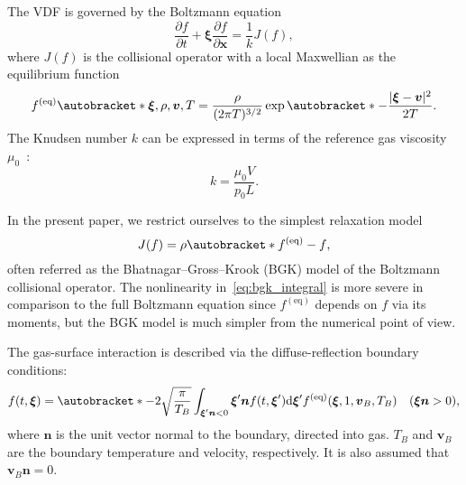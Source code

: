 \documentclass{elsarticle} %
\newcommand{\dd}{\mathrm{d}}
\newcommand{\pder}[2][]{\frac{\partial#1}{\partial#2}}
\DeclarePairedDelimiter\autobracket()       %
\newcommand{\br}[1]{\autobracket*{#1}}
\newcommand{\dxi}{\dd{\boldsymbol{\xi}}}
\newcommand{\bxi}{\boldsymbol{\xi}}
\newcommand{\bv}{\boldsymbol{v}}
\newcommand{\bn}{\boldsymbol{n}}
\newcommand{\bx}{\boldsymbol{x}}
\newcommand{\equil}[1]{#1^\mathrm{(eq)}}
\newcommand{\refer}[1]{#1_0}
\begin{document}
The VDF is governed by the Boltzmann equation
\begin{equation}\label{eq:Boltzmann}
    \pder[f]{t} + \bxi\pder[f]{\bx} = \frac1kJ(f),
\end{equation}
where \(J(f)\) is the collisional operator with a local Maxwellian as the equilibrium function
\begin{equation}\label{eq:equilibrium}
    \equil{f}\br{\bxi,\rho,\bv,T} = \frac{\rho}{(2\pi T)^{3/2}}\exp\br{-\frac{|\bxi-\bv|^2}{2T}}.
\end{equation}
The Knudsen number \(k\) can be expressed in terms of the reference gas viscosity \(\refer\mu\)~\cite{Sharipov1998}:
\begin{equation}\label{eq:Knudsen_number}
    k = \frac{\refer\mu V}{\refer{p}L}.
\end{equation}

In the present paper, we restrict ourselves to the simplest relaxation model~\cite{Krook1954, Welander1954}
\begin{equation}\label{eq:bgk_integral}
    J(f) = \rho\br{\equil{f}-f},
\end{equation}
often referred as the Bhatnagar--Gross--Krook (BGK) model of the Boltzmann collisional operator.
The nonlinearity in~\eqref{eq:bgk_integral} is more severe in comparison to the full Boltzmann equation
since \(\equil{f}\) depends on \(f\) via its moments,
but the BGK model is much simpler from the numerical point of view.

The gas-surface interaction is described via the diffuse-reflection boundary conditions:
\begin{equation}\label{eq:diffuse}
    f(t,\bxi) = \br{-2\sqrt\frac\pi{T_B} \int_{\bxi'\bn<0} \bxi'\bn f(t,\bxi')\dxi'}
        \equil{f}(\bxi,1,\bv_B,T_B) \quad (\bxi\bn>0),
\end{equation}
where \(\bn\) is the unit vector normal to the boundary, directed into gas.
\(T_B\) and \(\bv_B\) are the boundary temperature and velocity, respectively.
It is also assumed that \(\bv_B\bn = 0\).
\end{document}
